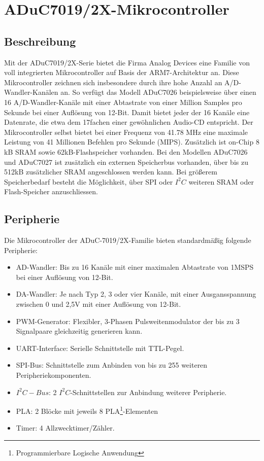 \section{ADuC7019/2X-Mikrocontroller}


    \subsection{Beschreibung}
        Mit der ADuC7019/2X-Serie bietet die Firma Analog Devices eine Familie von voll integrierten Mikrocontroller 
        auf Basis der ARM7-Architektur an. Diese Mikrocontroller zeichnen sich insbesondere durch ihre hohe Anzahl
        an A/D-Wandler-Kanälen an. So verfügt das Modell ADuC7026 beispielsweise über einen 16 A/D-Wandler-Kanäle
        mit einer Abtastrate von einer Million Samples pro Sekunde bei einer Auflösung von 12-Bit. Damit bietet jeder
        der 16 Kanäle eine Datenrate, die etwa dem 17fachen einer gewöhnlichen Audio-CD entspricht.
        Der Mikrocontroller selbst bietet bei einer Frequenz von 41.78 MHz eine maximale Leistung von 41 Millionen
        Befehlen pro Sekunde (MIPS). Zusätzlich ist on-Chip 8 kB SRAM sowie 62kB-Flashspeicher vorhanden. Bei den Modellen
        ADuC7026 und ADuC7027 ist zusätzlich ein externen Speicherbus vorhanden, über bis zu 512kB zusätzlicher SRAM
        angeschlossen werden kann. Bei größerem Speicherbedarf besteht die Möglichkeit, über SPI oder $I^2C$ weiteren SRAM 
        oder Flash-Speicher anzuschliessen.

    \subsection{Peripherie}
        Die Mikrocontroller der ADuC-7019/2X-Familie bieten standardmäßig folgende Peripherie:

        \begin{itemize}
            \item{AD-Wandler:} Bis zu 16 Kanäle mit einer maximalen Abtastrate von 1MSPS bei einer Auflösung von 12-Bit.
            \item{DA-Wandler:} Je nach Typ 2, 3 oder vier Kanäle, mit einer Ausgansspannung zwischen 0 und 2,5V mit einer
                               Auflösung von 12-Bit.
            \item{PWM-Generator:} Flexibler, 3-Phasen Pulsweitenmodulator der bis zu 3 Signalpaare gleichzeitig generieren kann.
            \item{UART-Interface:} Serielle Schnittstelle mit TTL-Pegel.
            \item{SPI-Bus:} Schnittstelle zum Anbinden von bis zu 255 weiteren Peripheriekomponenten.
            \item{$I^2C-Bus$:} 2 $I^2C$-Schnittstellen zur Anbindung weiterer Peripherie.
            \item{PLA:} 2 Blöcke mit jeweils 8 PLA\footnote{Programmierbare Logische Anwendung}-Elementen 
            \item{Timer:} 4 Allzwecktimer/Zähler.
        \end{itemize}
        
